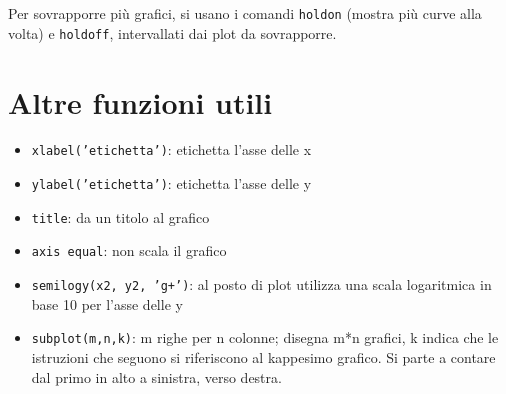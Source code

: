 Per sovrapporre più grafici, si usano i comandi \texttt{holdon} (mostra più curve alla volta) e \texttt{holdoff}, 
intervallati dai plot da 
sovrapporre.

\section{Altre funzioni utili}
\begin{itemize}
    \item \texttt{xlabel('etichetta')}: etichetta l'asse delle x
    \item \texttt{ylabel('etichetta')}: etichetta l'asse delle y
    \item \texttt{title}: da un titolo al grafico
    \item \texttt{axis equal}: non scala il grafico
    \item \texttt{semilogy(x2, y2, 'g+')}: al posto di plot utilizza una scala logaritmica in base 10 per l'asse delle y
    \item \texttt{subplot(m,n,k)}: m righe per n colonne; disegna m*n grafici, k indica che le istruzioni che seguono 
    si riferiscono al kappesimo grafico. Si parte a contare dal primo in alto a sinistra, verso destra.
\end{itemize}